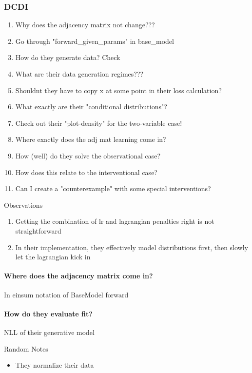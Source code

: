 \documentclass{article}
\begin{document}
\subsubsection{DCDI}
\begin{enumerate}
    \item Why does the adjacency matrix not change???
    \item Go through "forward_given_params" in base_model
    \item How do they generate data? Check \cite{hauser2012characterization}
    \item What are their data generation regimes???
    \item Shouldnt they have to copy x at some point in their loss calculation?
    \item What exactly are their "conditional distributions"?
    \item Check out their "plot-density" for the two-variable case!
    \item Where exactly does the adj mat learning come in?
    \item How (well) do they solve the observational case?
    \item How does this relate to the interventional case?
    \item Can I create a "counterexample" with some special interventions?
\end{enumerate}

\noindent
Observations
\begin{enumerate}
    \item Getting the combination of lr and lagrangian penalties right is not straightforward
    \item In their implementation, they effectively model distributions first, then slowly let the lagrangian kick in
\end{enumerate}

\paragraph{Where does the adjacency matrix come in?}
In einsum notation of BaseModel forward

\paragraph{How do they evaluate fit?}
NLL of their generative model

Random Notes
\begin{itemize}
    \item They normalize their data
\end{itemize}
\end{document}
